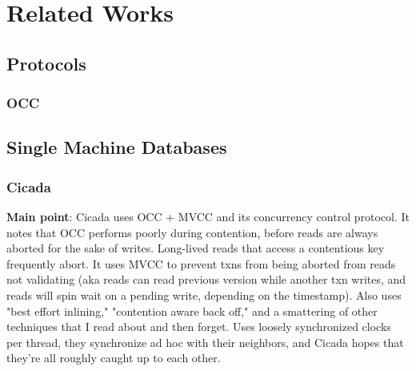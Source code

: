 \section{Related Works}
\subsection{Protocols}
\subsubsection{OCC}
\cite{occhtkung}
\subsection{Single Machine Databases}

\subsubsection{Cicada}
\textbf{Main point}: Cicada \cite{cicada} uses OCC + MVCC and its concurrency control protocol. It notes that OCC performs poorly during contention, before reads are always aborted for the sake of writes. Long-lived reads that access a contentious key frequently abort. It uses MVCC to prevent txns from being aborted from reads not validating (aka reads can read previous version while another txn writes, and reads will spin wait on a pending write, depending on the timestamp). Also uses "best effort inlining," "contention aware back off," and a smattering of other techniques that I read about and then forget. Uses loosely synchronized clocks per thread, they synchronize ad hoc with their neighbors, and Cicada hopes that they're all roughly caught up to each other.
